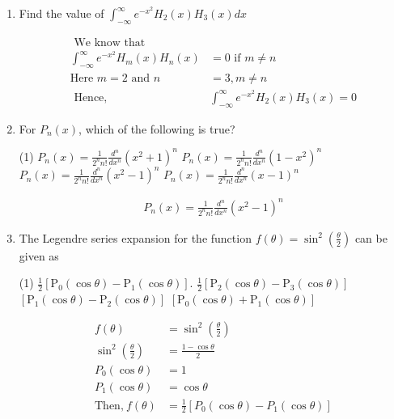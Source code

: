 \begin{enumerate}[label=\color{ocre}\textbf{\arabic*.}]
\item Find the value of $\int_{-\infty}^{\infty} e^{-x^{2}} H_{2}(x) H_{3}(x) d x$
\begin{answer}
	$$
	\begin{aligned}
\text{	We know that}&\\
	\int_{-\infty}^{\infty} e^{-x^{2}} H_{m}(x) H_{n}(x)&=0 \text { if } m \neq n\\
	\text{Here $m=2$ and }n&=3, m \neq n\\
\text{	Hence,}&
	\int_{-\infty}^{\infty} e^{-x^{2}} H_{2}(x) H_{3}(x)=0
	\end{aligned}
	$$
\end{answer}
\item For $P_{n}(x)$, which of the following is true?
\begin{tasks}(1)
	\task[\textbf{A.}] $P_{n}(x)=\frac{1}{2^{n} n !} \frac{d^{n}}{d x^{n}}\left(x^{2}+1\right)^{n}$
	\task[\textbf{B.}] $P_{n}(x)=\frac{1}{2^{n} n !} \frac{d^{n}}{d x^{n}}\left(1-x^{2}\right)^{n}$
	\task[\textbf{C.}] $P_{n}(x)=\frac{1}{2^{n} n !} \frac{d^{n}}{d x^{n}}\left(x^{2}-1\right)^{n}$
	\task[\textbf{D.}] $P_{n}(x)=\frac{1}{2^{n} n !} \frac{d^{n}}{d x^{n}}(x-1)^{n}$
\end{tasks}
\begin{answer}
	$$\begin{aligned}
	P_{n}(x)=\frac{1}{2^{n} n !} \frac{d^{n}}{d x^{n}}\left(x^{2}-1\right)^{n}
	\end{aligned}$$
\end{answer}
\item The Legendre series expansion for the function $f(\theta)=\sin ^{2}\left(\frac{\theta}{2}\right)$ can be given as

\begin{tasks}(1)
	\task[\textbf{A.}] $\frac{1}{2}\left[\mathrm{P}_{0}(\cos \theta)-\mathrm{P}_{1}(\cos \theta)\right]$.
	\task[\textbf{B.}] $\frac{1}{2}\left[\mathrm{P}_{2}(\cos \theta)-\mathrm{P}_{3}(\cos \theta)\right]$
	\task[\textbf{C.}] $\left[\mathrm{P}_{1}(\cos \theta)-\mathrm{P}_{2}(\cos \theta)\right]$
	\task[\textbf{D.}] $\left[\mathrm{P}_{0}(\cos \theta)+\mathrm{P}_{1}(\cos \theta)\right]$
\end{tasks}
\begin{answer}
$$\begin{aligned}
	f(\theta)&=\sin ^{2}\left(\frac{\theta}{2}\right)\\
	\sin ^{2}\left(\frac{\theta}{2}\right)&=\frac{1-\cos \theta}{2}\\
	{P}_{0}(\cos \theta)&=1\\
	{P}_{1}(\cos \theta)&=\cos \theta\\
	\text{Then,}\  f(\theta)&=\frac{1}{2}\left[{P}_{0}(\cos \theta)-{P}_{1}(\cos \theta) \right] 
\end{aligned}$$
\end{answer}


\end{enumerate}
